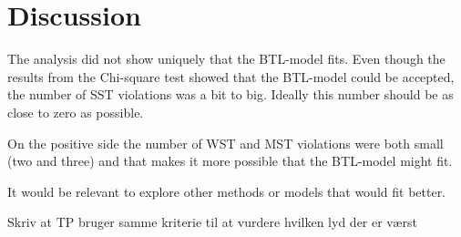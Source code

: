 \section*{Discussion}
\label{Discussion}
%
The analysis did not show uniquely that the BTL-model fits. Even though the results from the Chi-square test showed that the BTL-model could be accepted, the number of SST violations was a bit to big. Ideally this number should be as close to zero as possible. 

On the positive side the number of WST and MST violations were both small (two and three) and that makes it more possible that the BTL-model might fit. 

It would be relevant to explore other methods or models that would fit better. 



Skriv at TP bruger samme kriterie til at vurdere hvilken lyd der er værst